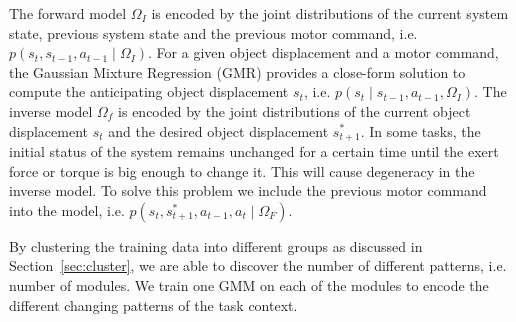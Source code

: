 \documentclass[preprint,12pt]{elsarticle}
\begin{document}

The forward model $\Omega_I$ is encoded by the joint distributions of the current system state, previous system state and the previous motor command, i.e. $p(s_t,s_{t-1},a_{t-1}\mid{\Omega_I})$. For a given object displacement and a motor command, the Gaussian Mixture Regression (GMR) provides a close-form solution to compute the anticipating object displacement $s_t$, i.e. $p(s_t{\mid}s_{t-1},a_{t-1},{\Omega_I})$. The inverse model $\Omega_f$ is encoded by the joint distributions of the current object displacement $s_t$ and the desired object displacement $s^{*}_{t+1}$. In some tasks, the initial status of the system remains unchanged for a certain time until the exert force or torque is big enough to change it. This will cause degeneracy in the inverse model. To solve this problem we include the previous motor command into the model, i.e. $p(s_t,s^{*}_{t+1},a_{t-1},a_t{\mid}{\Omega_F})$.



By clustering the training data into different groups as discussed in Section~\ref{sec:cluster}, we are able to discover the number of different patterns, i.e. number of modules. We train one GMM on each of the modules to encode the different changing patterns of the task context.
\end{document}
